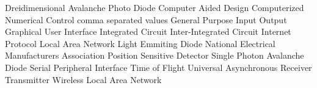 
	{Dreidimensional}
	{Avalanche Photo Diode}
	{Computer Aided Design}
	{Computerized Numerical Control}
	{comma separated values}
	{General Purpose Input Output}
	{Graphical User Interface}
	{Integrated Circuit}
	{Inter-Integrated Circuit}
	{Internet Protocol}
	{Local Area Network}
	{Light Emmiting Diode}
	{National Electrical Manufacturers Association}
	{Position Sensitive Detector}
	{Single Photon Avalanche Diode}
	{Serial Peripheral Interface}
	{Time of Flight}
	{Universal Asynchronous Receiver Transmitter}
	{Wireless Local Area Network}
